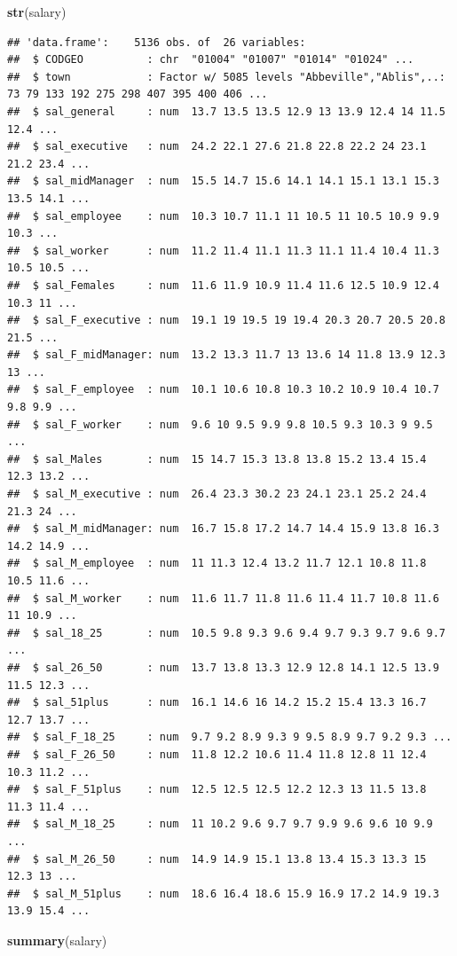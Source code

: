 \documentclass[]{article}
\newenvironment{Shaded}{\begin{snugshade}}{\end{snugshade}}
\newcommand{\KeywordTok}[1]{\textcolor[rgb]{0.13,0.29,0.53}{\textbf{#1}}}
\newcommand{\NormalTok}[1]{#1}
\begin{document}
\begin{Shaded}
\begin{Highlighting}[]
\KeywordTok{str}\NormalTok{(salary)}
\end{Highlighting}
\end{Shaded}

\begin{verbatim}
## 'data.frame':    5136 obs. of  26 variables:
##  $ CODGEO          : chr  "01004" "01007" "01014" "01024" ...
##  $ town            : Factor w/ 5085 levels "Abbeville","Ablis",..: 73 79 133 192 275 298 407 395 400 406 ...
##  $ sal_general     : num  13.7 13.5 13.5 12.9 13 13.9 12.4 14 11.5 12.4 ...
##  $ sal_executive   : num  24.2 22.1 27.6 21.8 22.8 22.2 24 23.1 21.2 23.4 ...
##  $ sal_midManager  : num  15.5 14.7 15.6 14.1 14.1 15.1 13.1 15.3 13.5 14.1 ...
##  $ sal_employee    : num  10.3 10.7 11.1 11 10.5 11 10.5 10.9 9.9 10.3 ...
##  $ sal_worker      : num  11.2 11.4 11.1 11.3 11.1 11.4 10.4 11.3 10.5 10.5 ...
##  $ sal_Females     : num  11.6 11.9 10.9 11.4 11.6 12.5 10.9 12.4 10.3 11 ...
##  $ sal_F_executive : num  19.1 19 19.5 19 19.4 20.3 20.7 20.5 20.8 21.5 ...
##  $ sal_F_midManager: num  13.2 13.3 11.7 13 13.6 14 11.8 13.9 12.3 13 ...
##  $ sal_F_employee  : num  10.1 10.6 10.8 10.3 10.2 10.9 10.4 10.7 9.8 9.9 ...
##  $ sal_F_worker    : num  9.6 10 9.5 9.9 9.8 10.5 9.3 10.3 9 9.5 ...
##  $ sal_Males       : num  15 14.7 15.3 13.8 13.8 15.2 13.4 15.4 12.3 13.2 ...
##  $ sal_M_executive : num  26.4 23.3 30.2 23 24.1 23.1 25.2 24.4 21.3 24 ...
##  $ sal_M_midManager: num  16.7 15.8 17.2 14.7 14.4 15.9 13.8 16.3 14.2 14.9 ...
##  $ sal_M_employee  : num  11 11.3 12.4 13.2 11.7 12.1 10.8 11.8 10.5 11.6 ...
##  $ sal_M_worker    : num  11.6 11.7 11.8 11.6 11.4 11.7 10.8 11.6 11 10.9 ...
##  $ sal_18_25       : num  10.5 9.8 9.3 9.6 9.4 9.7 9.3 9.7 9.6 9.7 ...
##  $ sal_26_50       : num  13.7 13.8 13.3 12.9 12.8 14.1 12.5 13.9 11.5 12.3 ...
##  $ sal_51plus      : num  16.1 14.6 16 14.2 15.2 15.4 13.3 16.7 12.7 13.7 ...
##  $ sal_F_18_25     : num  9.7 9.2 8.9 9.3 9 9.5 8.9 9.7 9.2 9.3 ...
##  $ sal_F_26_50     : num  11.8 12.2 10.6 11.4 11.8 12.8 11 12.4 10.3 11.2 ...
##  $ sal_F_51plus    : num  12.5 12.5 12.5 12.2 12.3 13 11.5 13.8 11.3 11.4 ...
##  $ sal_M_18_25     : num  11 10.2 9.6 9.7 9.7 9.9 9.6 9.6 10 9.9 ...
##  $ sal_M_26_50     : num  14.9 14.9 15.1 13.8 13.4 15.3 13.3 15 12.3 13 ...
##  $ sal_M_51plus    : num  18.6 16.4 18.6 15.9 16.9 17.2 14.9 19.3 13.9 15.4 ...
\end{verbatim}

\begin{Shaded}
\begin{Highlighting}[]
\KeywordTok{summary}\NormalTok{(salary)}
\end{Highlighting}
\end{Shaded}
\end{document}
